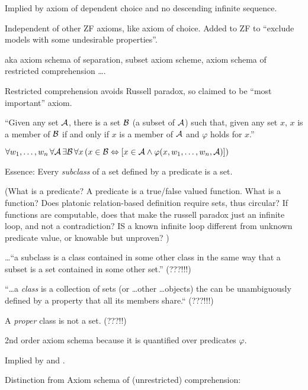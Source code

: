 Implied by axiom of dependent choice and 
no descending infinite sequence.

Independent of other \textsf{ZF} axioms, like axiom of choice.
Added to \textsf{ZF} to 
``exclude models with some undesirable properties''.

\label{sec:Axiom-schema-of-specification}

aka axiom schema of separation, subset axiom scheme,
axiom schema of restricted comprehension \ldots .

Restricted comprehension avoids Russell paradox,
so claimed to be ``most important'' axiom.

``Given any set $\mathcal{A}$, there is a set $\mathcal{B}$
 (a subset of $\mathcal{A}$) 
such that, given any set $x$, 
$x$ is a member of $\mathcal{B}$ if and only if $x$ 
is a member of $\mathcal{A}$ 
and $\varphi$ holds for $x$.''
\cite{wiki:AxiomSchemaOfSpecification}

${\displaystyle 
\forall w_{1},\ldots ,w_{n}\,
\forall \mathcal{A}\,\exists \mathcal{B}\,
\forall x\,
(x\in \mathcal{B}
\Leftrightarrow
[x\in \mathcal{A}\land \varphi (x,w_{1},\ldots ,w_{n},\mathcal{A})])}$

Essence:
Every \textsl{subclass}
of a set defined by a predicate is a set.

(What is a predicate?
A predicate is a true/false valued function.
What is a function? 
Does platonic relation-based definition require sets,
thus circular?
If functions are computable, does that make the
russell paradox just an infinite loop,
and not a contradiction?
IS a known infinite loop different from 
unknown predicate value, or knowable but unproven?
)

\ldots``a subclass is a class contained in some other class in 
the same way that a subset is a set contained in some other set.''
\cite{wiki:SubclassSetTheory}
(???!!!)

``\dots a \textsl{class} is a collection of sets 
(or \ldots other \ldots objects)
the can be unambiguously defined by a property 
that all its members share.``\cite{wiki:ClassSetTheory}
(???!!!)

A \textsl{proper} class is not a set. (???!!)

2nd order axiom schema because it is quantified over predicates
 $\varphi$.

Implied by 
and \cite{wiki:AxiomOfEmptySet}.

Distinction from Axiom schema of (unrestricted) comprehension:

